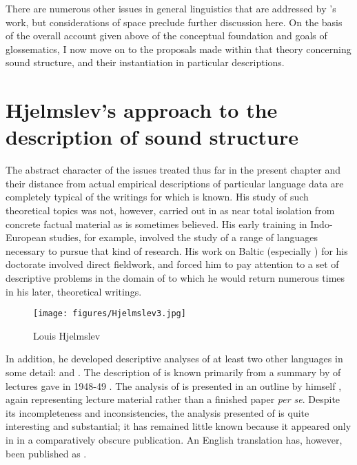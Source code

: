 There are numerous other issues in general linguistics that are
addressed by {\Hjelmslev}'s work, but considerations of space preclude
further discussion here. On the basis of the overall account given
above of the conceptual foundation and goals of glossematics, I now
move on to the proposals made within that theory concerning sound
structure, and their instantiation in particular descriptions.

\section{Hjelmslev's approach to the description of sound structure}

The abstract character of the issues treated thus far in the present
chapter and their distance from actual empirical descriptions of
particular language data are completely typical of the writings for
which {\Hjelmslev} is known. His study of such theoretical topics was
not, however, carried out in as near total isolation from concrete
factual material as is sometimes believed. His early training in
{Indo-European} studies, for example, involved the study of a range of
languages necessary to pursue that kind of research. His work on
Baltic (especially ) for his doctorate involved direct
fieldwork, and forced him to pay attention to a set of descriptive
problems in the domain of  to which he would return numerous
times in his later, theoretical writings.

\begin{wrapfigure}{r}{.4\textwidth}
  \texttt{[image: figures/Hjelmslev3.jpg]}
  \caption{Louis Hjelmslev}
  \label{fig:ch.hjelmslev.hjelmslev3}
\end{wrapfigure}
In addition, he developed descriptive analyses of at least two other
languages in some detail:  and . The description of 
is known primarily from a summary by  of lectures
{\Hjelmslev} gave in 1948-49 \citep{hjelmslev70:french}. The analysis of
 is presented in an outline by {\Hjelmslev} himself
\citep{hjelmslev51:danish}, again representing lecture material rather
than a finished paper \emph{per se}. Despite its incompleteness and
inconsistencies, the analysis presented of  is quite interesting
and substantial; it has remained little known because it appeared only
in  in a comparatively obscure publication.  An {English}
translation has, however, been published as
\citealt[247--266]{hjelmslev73:essais.2}.

